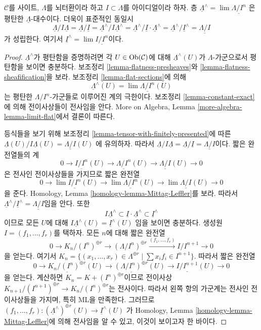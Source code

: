 \begin{lemma}
\label{lemma-completion-flat}
$\mathcal{C}$를 사이트, $\Lambda$를 뇌터환이라 하고
$I \subset \Lambda$를 아이디얼이라 하자. 층
$\underline{\Lambda}^\wedge = \lim \underline{\Lambda/I^n}$
은 평탄한 $\underline{\Lambda}$-대수이다. 더욱이 표준적인 동일시
$$
\underline{\Lambda}/I\underline{\Lambda} =
\underline{\Lambda}/\underline{I} =
\underline{\Lambda}^\wedge/I\underline{\Lambda}^\wedge =
\underline{\Lambda}^\wedge/\underline{I} \cdot \underline{\Lambda}^\wedge =
\underline{\Lambda}^\wedge/\underline{I}^\wedge =
\underline{\Lambda/I}
$$
가 성립한다. 여기서 $\underline{I}^\wedge = \lim \underline{I/I^n}$이다.
\end{lemma}

\begin{proof}
$\underline{\Lambda}^\wedge$가 평탄함을 증명하려면 각
$U \in \mathop{\mathrm{Ob}}\nolimits(\mathcal{C})$에 대해 $\underline{\Lambda}^\wedge(U)$가
$\Lambda$-가군으로서 평탄함을 보이면 충분하다. 보조정리
\ref{lemma-flatness-presheaves}와 \ref{lemma-flatness-sheafification}을
보라. 보조정리 \ref{lemma-flat-sections}에 의해
$$
\underline{\Lambda}^\wedge(U) = \lim \underline{\Lambda/I^n}(U)
$$
는 평탄한 $\Lambda/I^n$-가군들로 이루어진 계의 극한이다.
보조정리 \ref{lemma-constant-exact}에 의해 전이사상들이 전사임을 안다.
More on Algebra, Lemma \ref{more-algebra-lemma-limit-flat}에서 결론이 따른다.

\medskip\noindent
등식들을 보기 위해 보조정리 \ref{lemma-tensor-with-finitely-presented}에 따른
$\underline{\Lambda}(U)/I\underline{\Lambda}(U) = \underline{\Lambda/I}(U)$
에 유의하자. 따라서 $\underline{\Lambda}/I\underline{\Lambda} =
\underline{\Lambda}/\underline{I} = \underline{\Lambda/I}$이다.
짧은 완전열들의 계
$$
0 \to \underline{I/I^n}(U) \to \underline{\Lambda/I^n}(U) \to
\underline{\Lambda/I}(U) \to 0
$$
은 전사인 전이사상들을 가지므로 짧은 완전열
$$
0 \to \lim \underline{I/I^n}(U) \to \lim \underline{\Lambda/I^n}(U) \to
\lim \underline{\Lambda/I}(U) \to 0
$$
을 준다. Homology, Lemma \ref{homology-lemma-Mittag-Leffler}를 보라.
따라서
$\underline{\Lambda}^\wedge/\underline{I}^\wedge =
\underline{\Lambda/I}$임을 안다. 또한
$$
I \underline{\Lambda}^\wedge \subset
\underline{I} \cdot \underline{\Lambda}^\wedge \subset
\underline{I}^\wedge
$$
이므로 모든 $U$에 대해
$I \underline{\Lambda}^\wedge(U) = \underline{I}^\wedge(U)$
임을 보이면 충분하다. 생성원 $I = (f_1, \ldots, f_r)$를 택하자.
모든 $n$에 대해 짧은 완전열
$$
0 \to K_n/(I^n)^{\oplus r} \to (\Lambda/I^n)^{\oplus r}
\xrightarrow{(f_1, \ldots, f_r)}
I/I^{n + 1} \to 0
$$
을 얻는다. 여기서
$K_n =
\{(x_1, \ldots, x_r) \in \Lambda^{\oplus r} \mid \sum x_i f_i \in I^{n + 1}\}$.
따라서 짧은 완전열
$$
0 \to \underline{K_n/(I^n)^{\oplus r}}(U) \to
\underline{(\Lambda/I^n)^{\oplus r}}(U) \to
\underline{I/I^{n + 1}}(U) \to 0
$$
을 얻는다. 계산하면 $K_n = K + (I^n)^{\oplus r}$이므로 전이사상
$K_{n + 1}/(I^{n + 1})^{\oplus r} \to K_n/(I^n)^{\oplus r}$는 전사이다.
따라서 왼쪽 항의 가군계는 전사인 전이사상들을 가지며, 특히 ML을
만족한다. 그러므로
$(f_1, \ldots, f_r) :
(\underline{\Lambda}^\wedge)^{\oplus r}(U) \to \underline{I}^\wedge(U)$
가 Homology, Lemma \ref{homology-lemma-Mittag-Leffler}에 의해 전사임을
알 수 있고, 이것이 보이고자 한 바이다.
\end{proof}

